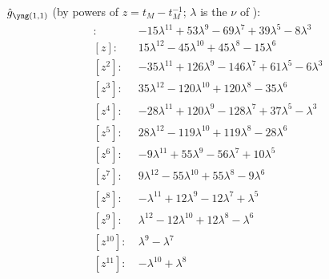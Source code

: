 $\hat g_{\yoneone}$ (by powers of $z = t_M - t_M^{-1}$; $\lambda$ is the $\nu$ of \cite{Marino09}):
\begin{align*}
[z^{0}]\colon\ & -15 \lambda^{11} +53 \lambda^{9} -69 \lambda^{7} +39 \lambda^{5} -8 \lambda^{3} \\
[z]\colon\ & 15 \lambda^{12} -45 \lambda^{10} +45 \lambda^{8} -15 \lambda^{6} \\
[z^{2}]\colon\ & -35 \lambda^{11} +126 \lambda^{9} -146 \lambda^{7} +61 \lambda^{5} -6 \lambda^{3} \\
[z^{3}]\colon\ & 35 \lambda^{12} -120 \lambda^{10} +120 \lambda^{8} -35 \lambda^{6} \\
[z^{4}]\colon\ & -28 \lambda^{11} +120 \lambda^{9} -128 \lambda^{7} +37 \lambda^{5} -\lambda^{3} \\
[z^{5}]\colon\ & 28 \lambda^{12} -119 \lambda^{10} +119 \lambda^{8} -28 \lambda^{6} \\
[z^{6}]\colon\ & -9 \lambda^{11} +55 \lambda^{9} -56 \lambda^{7} +10 \lambda^{5} \\
[z^{7}]\colon\ & 9 \lambda^{12} -55 \lambda^{10} +55 \lambda^{8} -9 \lambda^{6} \\
[z^{8}]\colon\ & -\lambda^{11} +12 \lambda^{9} -12 \lambda^{7} +\lambda^{5} \\
[z^{9}]\colon\ & \lambda^{12} -12 \lambda^{10} +12 \lambda^{8} -\lambda^{6} \\
[z^{10}]\colon\ & \lambda^{9} -\lambda^{7} \\
[z^{11}]\colon\ & -\lambda^{10} +\lambda^{8}
\end{align*}
